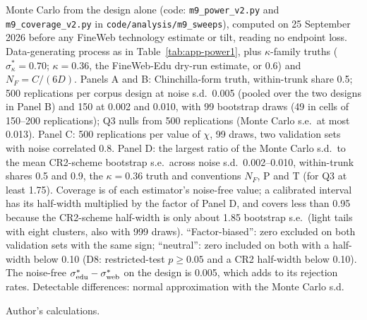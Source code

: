 \begin{table}[tp]
\begin{tablenotes}
Monte Carlo from the design alone (code: \texttt{m9\_power\_v2.py} and \texttt{m9\_coverage\_v2.py} in
\texttt{code/analysis/m9\_sweeps}), computed on 25 September 2026 before any FineWeb technology estimate or tilt,
reading no endpoint loss. Data-generating process as in Table~\ref{tab:app-power1}, plus $\kappa$-family truths
($\sigma^*_\kappa=0.70$; $\kappa=0.36$, the FineWeb-Edu dry-run estimate, or 0.6) and $N_F=C/(6D)$. Panels A and B: Chinchilla-form truth, within-trunk share 0.5; 500 replications per corpus design at
noise s.d.\ 0.005 (pooled over the two designs in Panel B) and 150 at 0.002 and 0.010, with 99 bootstrap draws (49 in
cells of 150--200 replications); Q3 nulls from 500 replications (Monte Carlo s.e.\ at most 0.013). Panel C: 500
replications per value of $\chi$, 99 draws, two validation sets with noise correlated 0.8. Panel D: the largest ratio
of the Monte Carlo s.d.\ to the mean CR2-scheme bootstrap s.e.\ across noise s.d.\ 0.002--0.010, within-trunk shares 0.5
and 0.9, the $\kappa=0.36$ truth and conventions $N_F$, P and T (for Q3 at least 1.75). Coverage is of each estimator's
noise-free value; a calibrated interval has its half-width multiplied by the factor of Panel D, and covers less than
0.95 because the CR2-scheme half-width is only about 1.85 bootstrap s.e.\ (light tails with eight clusters, also
with 999 draws). ``Factor-biased'': zero excluded on both validation sets with the same sign;
``neutral'': zero included on both with a half-width below 0.10 (D8: restricted-test $p\ge0.05$ and a CR2 half-width
below 0.10). The noise-free $\sigma^*_{\rm edu}-\sigma^*_{\rm web}$ on the design is 0.005, which adds to its rejection
rates. Detectable differences: normal approximation with the Monte Carlo s.d.
\end{tablenotes}
\begin{tablenotes}[Source]
Author's calculations.
\end{tablenotes}
\end{table}
